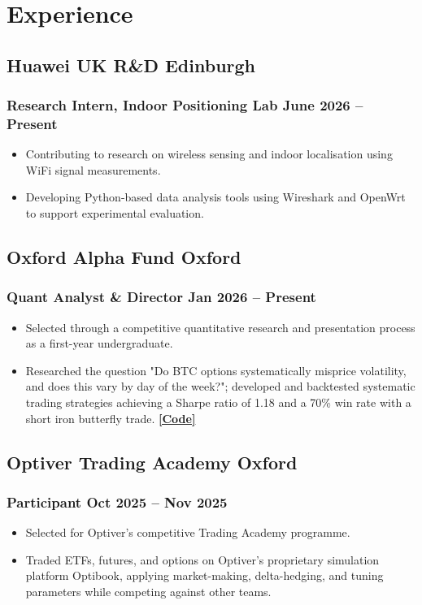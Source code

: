 \documentclass[9pt]{article} %
\begin{document}
\section{Experience}

\subsection{Huawei UK R\&D \hfill Edinburgh}
\subsubsection{Research Intern, Indoor Positioning Lab \hfill June 2026 -- Present}
\begin{itemize}
    \item Contributing to research on wireless sensing and indoor localisation using WiFi signal measurements.
    \item Developing Python-based data analysis tools using Wireshark and OpenWrt to support experimental evaluation.
\end{itemize}

\subsection{Oxford Alpha Fund \hfill Oxford}
\subsubsection{Quant Analyst \& Director \hfill Jan 2026 -- Present}
\begin{itemize}
    \item Selected through a competitive quantitative research and presentation process as a first-year undergraduate.
    \item Researched the question "Do BTC options systematically misprice volatility, and does this vary by day of the week?"; developed and backtested systematic trading strategies achieving a Sharpe ratio of 1.18 and a 70\% win rate with a short iron butterfly trade. {\small\href{https://github.com/Harik-S/oaf-hilary-2026}{\textbf{[Code]}}}
\end{itemize}

\subsection{Optiver Trading Academy \hfill Oxford}
\subsubsection{Participant \hfill Oct 2025 -- Nov 2025}
\begin{itemize}
    \item Selected for Optiver's competitive Trading Academy programme.
    \item Traded ETFs, futures, and options on Optiver's proprietary simulation platform Optibook, applying market-making, delta-hedging, and tuning parameters while competing against other teams.
\end{itemize}
\end{document}
